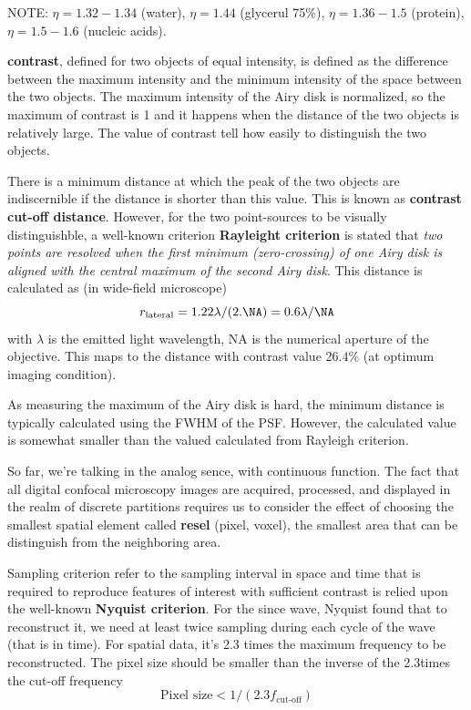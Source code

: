 NOTE: $\eta=1.32-1.34$ (water), $\eta=1.44$ (glycerul 75\%), $\eta=1.36-1.5$
(protein), $\eta=1.5-1.6$ (nucleic acids).


{\bf contrast}, defined for two objects of equal intensity, is defined as the
difference between the maximum intensity and the minimum intensity of the space
between the two objects. The maximum intensity of the Airy disk is normalized,
so the maximum of contrast is 1 and it happens when the distance of the two
objects is relatively large. The value of contrast tell how easily to
distinguish the two objects. 

There is a minimum distance at which the peak of the two objects are
indiscernible if the distance is shorter than this value. This is known as {\bf
contrast cut-off distance}. However, for the two point-sources to be visually
distinguishble, a well-known criterion {\bf Rayleight criterion} is stated that
{\it two points are resolved when the first minimum  (zero-crossing) of one Airy
disk is aligned with the central maximum of the second Airy disk}. This distance
is calculated as (in wide-field microscope)
\begin{equation}
r_\text{lateral} = 1.22\lambda/(2.\NA) = 0.6\lambda/\NA
\end{equation}
with $\lambda$ is the emitted light wavelength, NA is the numerical aperture of
the objective. This maps to the distance with contrast value 26.4\% (at optimum
imaging condition). 

As measuring the maximum of the Airy disk is hard, the minimum distance is
typically calculated using the FWHM of the PSF. However, the calculated value is
somewhat smaller than the valued calculated from Rayleigh criterion. 

So far, we're talking in the analog sence, with continuous function. The fact
that all digital confocal microscopy images are acquired, processed, and
displayed in the realm of discrete partitions requires us to consider the effect
of choosing the smallest spatial element called {\bf resel} (pixel, voxel), the
smallest area that can be distinguish from the neighboring area.  

Sampling criterion refer to the sampling interval in space and time that is
required to reproduce features of interest with sufficient contrast is relied
upon the well-known {\bf Nyquist criterion}. For the  since wave, Nyquist found
that to reconstruct it, we need at least twice sampling during each cycle of the
wave (that is in time). For spatial data, it's 2.3 times the maximum frequency
to be reconstructed. The pixel size should be smaller than the inverse of the
2.3times the cut-off frequency
\begin{equation}
\text{Pixel size} < 1/(2.3f_\text{cut-off})
\end{equation}

